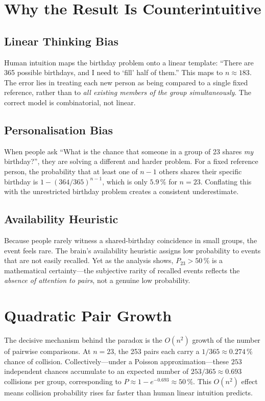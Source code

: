 \documentclass[12pt]{report}
\theoremstyle{definition}
\begin{document}
\section{Why the Result Is Counterintuitive}

\subsection{Linear Thinking Bias}

Human intuition maps the birthday problem onto a linear template: ``There are 365
possible birthdays, and I need to `fill' half of them.''  This maps to $n \approx 183$.
The error lies in treating each new person as being compared to a single fixed
reference, rather than to \emph{all existing members of the group simultaneously}.
The correct model is combinatorial, not linear.

\subsection{Personalisation Bias}

When people ask ``What is the chance that someone in a group of 23 shares \emph{my}
birthday?'', they are solving a different and harder problem.  For a fixed reference
person, the probability that at least one of $n-1$ others shares their specific birthday
is $1 - (364/365)^{n-1}$, which is only $5.9\,\%$ for $n = 23$.  Conflating this with
the unrestricted birthday problem creates a consistent underestimate.

\subsection{Availability Heuristic}

Because people rarely witness a shared-birthday coincidence in small groups, the event
feels rare.  The brain's availability heuristic assigns low probability to events that
are not easily recalled.  Yet as the analysis shows, $P_{23} > 50\,\%$ is a
mathematical certainty—the subjective rarity of recalled events reflects the
\emph{absence of attention to pairs}, not a genuine low probability.

\section{Quadratic Pair Growth}

The decisive mechanism behind the paradox is the $O(n^2)$ growth of the number of
pairwise comparisons.  At $n = 23$, the 253 pairs each carry a $1/365 \approx 0.274\,\%$
chance of collision.  Collectively—under a Poisson approximation—these $253$ independent
chances accumulate to an expected number of $253/365 \approx 0.693$ collisions per
group, corresponding to $P \approx 1 - e^{-0.693} \approx 50\,\%$.  This $O(n^2)$
effect means collision probability rises far faster than human linear intuition predicts.
\end{document}
